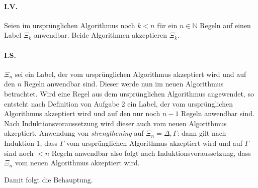 \paragraph{I.V.} Seien im ursprünglichen Algorithmus noch $k < n$ für ein $n \in \mathbb{N}$ Regeln auf einen Label
$\Xi_k$ anwendbar. Beide Algorithmen akzeptieren $\Xi_k$.

\paragraph{I.S.} $\Xi_n$ sei ein Label, der vom ursprünglichen Algorithmus akzeptiert wird und auf den $n$ Regeln
anwendbar sind. Dieser werde nun im neuen Algorithmus betrachtet. Wird eine Regel aus dem ursprünglichen Algorithmus
angewendet, so entsteht nach Definition von Aufgabe 2 ein Label, der vom ursprünglichen Algorithmus akzeptiert wird und
auf den nur noch $n-1$ Regeln anwendbar sind. Nach Induktionsvoraussetzung wird dieser auch vom neuen Algorithmus
akzeptiert. Anwendung von \emph{strengthening} auf $\Xi_n = \Delta, \Gamma$: dann gilt nach Induktion 1, dass $\Gamma$
vom ursprünglichen Algorithmus akzeptiert wird und auf $\Gamma$ sind noch $< n$ Regeln anwendbar also folgt nach
Induktionsvoraussetzung, dass $\Xi_n$ vom neuen Algorithmus akzeptiert wird.

Damit folgt die Behauptung.
